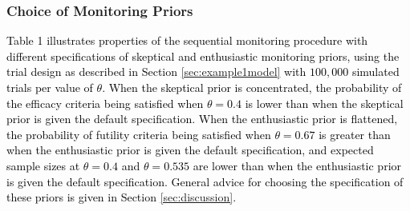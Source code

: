\documentclass[12pt]{article}
\begin{document}
\subsubsection{Choice of Monitoring Priors}

\textcolor{black}{Table 1 illustrates properties of the sequential monitoring procedure with different specifications of skeptical and enthusiastic monitoring priors, using the trial design as described in Section \ref{sec:example1model} with $100,000$ simulated trials per value of $\theta$. When the skeptical prior is concentrated, the probability of the efficacy criteria being satisfied when $\theta=0.4$ is lower than when the skeptical prior is given the default specification. When the enthusiastic prior is flattened, the probability of futility criteria being satisfied when $\theta=0.67$ is greater than when the enthusiastic prior is given the default specification, and expected sample sizes at $\theta=0.4$ and $\theta=0.535$ are lower than when the enthusiastic prior is given the default specification. General advice for choosing the specification of these priors is given in Section \ref{sec:discussion}.}
\end{document}
